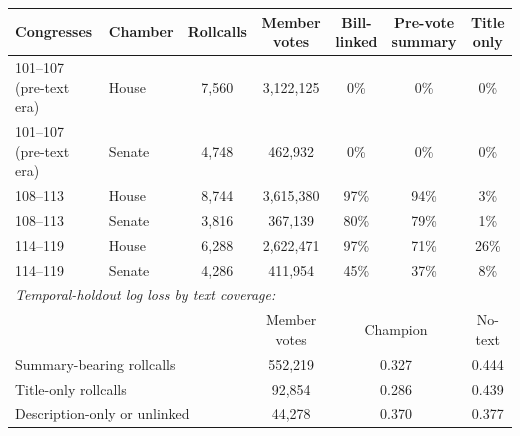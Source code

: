 \begin{tabular}{llccccc}
\toprule
Congresses & Chamber & Rollcalls & \shortstack{Member\\votes} & \shortstack{Bill-\\linked} & \shortstack{Pre-vote\\summary} & \shortstack{Title\\only} \\
\midrule
101--107 (pre-text era) & House & 7,560 & 3,122,125 & 0\% & 0\% & 0\% \\
101--107 (pre-text era) & Senate & 4,748 & 462,932 & 0\% & 0\% & 0\% \\
108--113 & House & 8,744 & 3,615,380 & 97\% & 94\% & 3\% \\
108--113 & Senate & 3,816 & 367,139 & 80\% & 79\% & 1\% \\
114--119 & House & 6,288 & 2,622,471 & 97\% & 71\% & 26\% \\
114--119 & Senate & 4,286 & 411,954 & 45\% & 37\% & 8\% \\
\midrule
\multicolumn{7}{l}{\emph{Temporal-holdout log loss by text coverage:}} \\
\multicolumn{3}{l}{} & Member votes & \multicolumn{2}{c}{Champion} & No-text \\
\multicolumn{3}{l}{\quad Summary-bearing rollcalls} & 552,219 & \multicolumn{2}{c}{0.327} & 0.444 \\
\multicolumn{3}{l}{\quad Title-only rollcalls} & 92,854 & \multicolumn{2}{c}{0.286} & 0.439 \\
\multicolumn{3}{l}{\quad Description-only or unlinked} & 44,278 & \multicolumn{2}{c}{0.370} & 0.377 \\
\bottomrule
\end{tabular}
